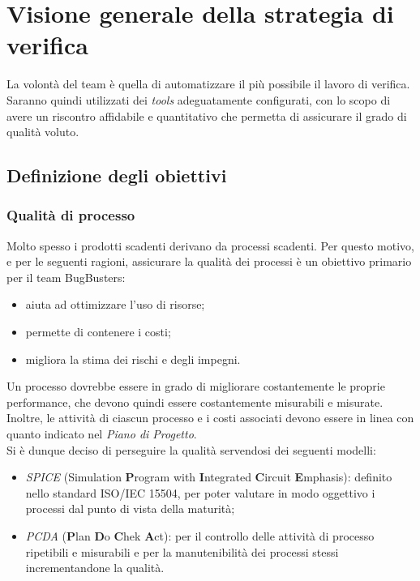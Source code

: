 \section{Visione generale della strategia di verifica}
La volont\`a del team \`e quella di automatizzare il pi\`u possibile il lavoro di verifica. Saranno quindi utilizzati dei \textit{tools} adeguatamente configurati, con lo scopo di avere un riscontro affidabile e quantitativo che permetta di assicurare il grado di qualit\`a voluto. 

\subsection{Definizione degli obiettivi}
\subsubsection{Qualit\`a di processo}
Molto spesso i prodotti scadenti derivano da processi scadenti. Per questo motivo, e per le seguenti ragioni, assicurare la qualità dei processi \`e un obiettivo primario per il team BugBusters:
\begin{itemize}
	\item aiuta ad ottimizzare l'uso di risorse;
	\item permette di contenere i costi;
	\item migliora la stima dei rischi e degli impegni.
\end{itemize}
Un processo dovrebbe essere in grado di migliorare costantemente le proprie performance, che devono quindi essere costantemente misurabili e misurate. Inoltre, le attivit\`a di ciascun processo e i costi associati devono essere in linea con quanto indicato nel \textit{Piano di Progetto}. \\
Si \`e dunque deciso di perseguire la qualit\`a servendosi dei seguenti modelli: 
\begin{itemize}
	\item \textit{SPICE} (Simulation \textbf{P}rogram with \textbf{I}ntegrated \textbf{C}ircuit \textbf{E}mphasis): definito nello standard ISO/IEC 15504, per poter valutare in modo oggettivo i processi dal punto di vista della maturit\`a;
	\item \textit{PCDA} (\textbf{P}lan \textbf{D}o \textbf{C}hek \textbf{A}ct): per il controllo delle attività di processo ripetibili e misurabili e per la manutenibilità dei processi stessi incrementandone la qualit\`a.
\end{itemize}

